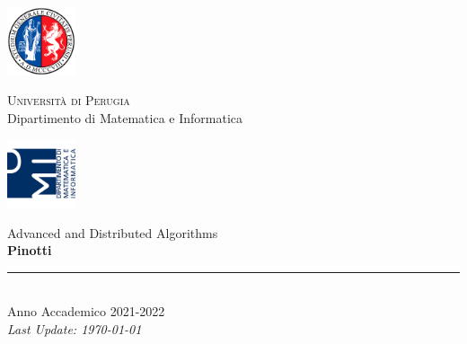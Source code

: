 
\thispagestyle{empty} %

\noindent %
\includegraphics[width=0.15\textwidth]{frontmatter/imgs/logoUniPg.jpg}
\begin{minipage}[b]{0.7\textwidth}
    \centering
    {\Large \textsc{Universit{\`a} di Perugia}}\\
    \vspace{0.4 em}
    {\large Dipartimento di Matematica e Informatica}
    \vspace{0.6 em}
\end{minipage}%
\includegraphics[width=0.15\textwidth]{frontmatter/imgs/logoDMI.jpg}

\vspace{8 em}

\begin{center}
    {\Huge Advanced and Distributed Algorithms}\\
    \vspace{5 em}
    {\Huge \textbf{Pinotti}}\\

    \vfill

    \rule{380pt}{.4pt}\\
    \vspace{1.2 em}
    \large{Anno Accademico 2021-2022}\\
    \vspace{.9 em}
    \small{\textit{Last Update: \today{}}}
\end{center}

